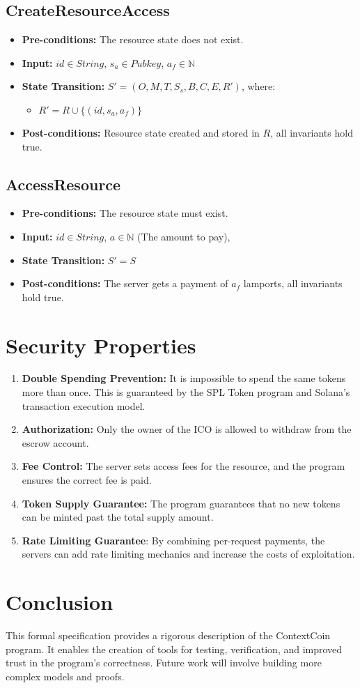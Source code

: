 \documentclass{article}
\begin{document}
\subsection{CreateResourceAccess}
\begin{itemize}
    \item \textbf{Pre-conditions:} The resource state does not exist.
    \item \textbf{Input:}  $id \in String$, $s_a \in Pubkey$, $a_f \in \mathbb{N}$
    \item \textbf{State Transition:}
            $S' = (O, M, T, S_s, B, C, E, R')$, where:
            \begin{itemize}
                \item $R' = R \cup \{ (id, s_a, a_f) \}$
            \end{itemize}
    \item \textbf{Post-conditions:} Resource state created and stored in $R$, all invariants hold true.
\end{itemize}
\subsection{AccessResource}
\begin{itemize}
   \item \textbf{Pre-conditions:} The resource state must exist.

        \item \textbf{Input:}  $id \in String$, $a \in \mathbb{N}$ (The amount to pay),

         \item \textbf{State Transition:}
        $S' = S$
      \item \textbf{Post-conditions:} The server gets a payment of $a_f$ lamports, all invariants hold true.
\end{itemize}
\section{Security Properties}

\begin{enumerate}
    \item \textbf{Double Spending Prevention:} It is impossible to spend the same tokens more than once. This is guaranteed by the SPL Token program and Solana's transaction execution model.
    \item \textbf{Authorization:} Only the owner of the ICO is allowed to withdraw from the escrow account.
    \item \textbf{Fee Control:} The server sets access fees for the resource, and the program ensures the correct fee is paid.
    \item \textbf{Token Supply Guarantee:} The program guarantees that no new tokens can be minted past the total supply amount.
    \item \textbf{Rate Limiting Guarantee}: By combining per-request payments, the servers can add rate limiting mechanics and increase the costs of exploitation.
\end{enumerate}
\section{Conclusion}

This formal specification provides a rigorous description of the ContextCoin program. It enables the creation of tools for testing, verification, and improved trust in the program's correctness. Future work will involve building more complex models and proofs.
\end{document}

